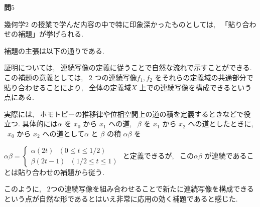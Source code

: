 \documentclass[10pt]{jsarticle}
\begin{document}
\bigskip
\bigskip

\newpage
{\bf 問$5$}

幾何学$2$ の授業で学んだ内容の中で特に印象深かったものとしては, \ 「貼り合わせの補題」が挙げられる. 

補題の主張は以下の通りである.

\bigskip


\bigskip

証明については, \ 連続写像の定義に従うことで自然な流れで示すことができる.
この補題の意義としては, \ $2$ つの連続写像$f_1, f_2$ をそれらの定義域の共通部分で貼り合わせることにより, \ 全体の定義域$X$ 上での連続写像を構成できるという点にある.

実際には, \ ホモトピーの推移律や位相空間上の道の積を定義するときなどで役立つ. 具体的には$\alpha$ を $x_0$ から $x_1$ への道, \ $\beta$ を $x_1$ から $x_2$ への道としたときに, \ $x_0$ から $x_2$ への道として$\alpha$ と $\beta$ の積 $\alpha\beta$ を 

$\alpha\beta = \begin{cases}
 \alpha(2t) \ \ \ (0 \le t \le 1/2)\\
 \beta(2t-1) \ \ \ (1/2 \le t \le 1)
\end{cases}$ 
と定義できるが, \ この$\alpha\beta$ が連続であることは貼り合わせの補題から従う.

このように, \ $2$つの連続写像を組み合わせることで新たに連続写像を構成できるという点が自然な形であるとはいえ非常に応用の効く補題であると感じた. 
\end{document}
